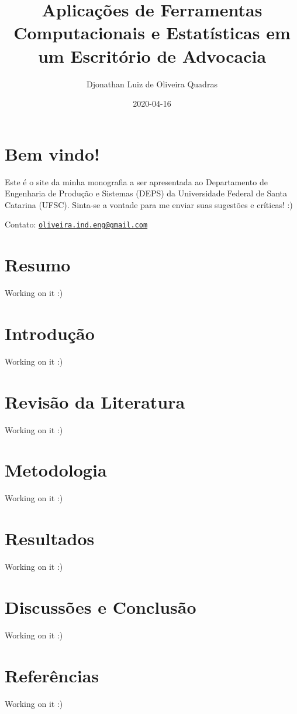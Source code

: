 \documentclass[
]{book}
\title{Aplicações de Ferramentas Computacionais e Estatísticas em um Escritório de Advocacia}
\author{Djonathan Luiz de Oliveira Quadras}
\date{2020-04-16}
\begin{document}
\maketitle

{
\setcounter{tocdepth}{1}
\tableofcontents
}
\hypertarget{bem-vindo}{%
\chapter*{Bem vindo!}\label{bem-vindo}}

Este é o site da minha monografia a ser apresentada ao Departamento de Engenharia de Produção e Sistemas (DEPS) da Universidade Federal de Santa Catarina (UFSC). Sinta-se a vontade para me enviar suas sugestões e críticas! :)

Contato: \href{mailto:oliveira.ind.eng@gmail.com}{\nolinkurl{oliveira.ind.eng@gmail.com}}

\hypertarget{resumo}{%
\chapter*{Resumo}\label{resumo}}

Working on it :)

\hypertarget{introduuxe7uxe3o}{%
\chapter{Introdução}\label{introduuxe7uxe3o}}

Working on it :)

\hypertarget{revisuxe3o-da-literatura}{%
\chapter{Revisão da Literatura}\label{revisuxe3o-da-literatura}}

Working on it :)

\hypertarget{metodologia}{%
\chapter{Metodologia}\label{metodologia}}

Working on it :)

\hypertarget{resultados}{%
\chapter{Resultados}\label{resultados}}

Working on it :)

\hypertarget{discussuxf5es-e-conclusuxe3o}{%
\chapter{Discussões e Conclusão}\label{discussuxf5es-e-conclusuxe3o}}

Working on it :)

\hypertarget{referuxeancias}{%
\chapter*{Referências}\label{referuxeancias}}

Working on it :)
\end{document}
